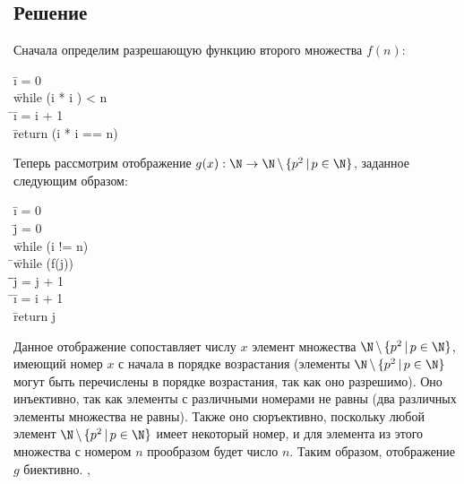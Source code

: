 \documentclass[a4paper,12pt]{article}
\newcommand{\tab}{\quad\=}
\newenvironment{programm}{
    \ttfamily
    \smallskip
    \begin{tabbing}
    }
    {
    \end{tabbing}
    \smallskip
}
\begin{document}
	\subsection*{Решение}
	Сначала определим разрешающую функцию второго множества $f(n)$:
    \begin{programm}
    \tab i = 0\\
    \tab while (i * i ) < n\\
    \tab\tab i = i + 1\\
    \tab return (i * i == n)
    \end{programm}
    Теперь рассмотрим отображение $g(x): \N\to\N\,\backslash\,\{p^2\,|\,p\in\N\}$, заданное следующим образом:
	
    \begin{programm}
    \tab i = 0\\
    \tab j = 0\\
    \tab while (i != n)\\
    \tab\tab while (f(j))\\
    \tab\tab\tab j = j + 1\\
    \tab\tab i = i + 1\\
    \tab return j
    \end{programm}
	
	Данное отображение сопоставляет числу $x$ элемент множества $\N\,\backslash\,\{p^2\,|\,p\in\N\}$, имеющий номер $x$ с начала в порядке возрастания (элементы $\N\,\backslash\,\{p^2\,|\,p\in\N\}$ могут быть перечислены в порядке возрастания, так как оно разрешимо). Оно инъективно, так как элементы с различными номерами не равны (два различных элементы множества не равны). Также оно сюръективно, поскольку любой элемент $\N\,\backslash\,\{p^2\,|\,p\in\N\}$ имеет некоторый номер, и для элемента из этого множества с номером $n$ прообразом будет число $n$. Таким образом, отображение $g$ биективно.
	\sep	
	
\end{document}
